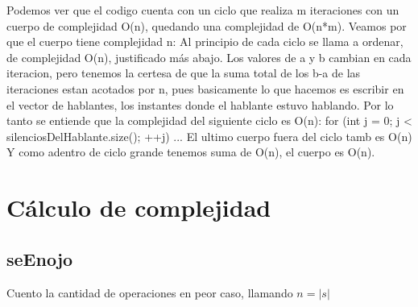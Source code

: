 \documentclass{article}
\begin{document}
Podemos ver que el codigo cuenta con un ciclo que realiza m iteraciones con un cuerpo de complejidad O(n), quedando una
complejidad de O(n*m). \newline
Veamos por que el cuerpo tiene complejidad n: \newline
Al principio de cada ciclo se llama a ordenar, de complejidad O(n), justificado más abajo. \newline
Los valores de a y b cambian en cada iteracion, pero tenemos la certesa de que la suma total de los b-a de las
iteraciones estan acotados por n, pues basicamente lo que hacemos es escribir en el vector de hablantes, los instantes
donde el hablante estuvo hablando. Por lo tanto se entiende que la complejidad del siguiente ciclo es O(n): \newline
for (int j = 0; j < silenciosDelHablante.size(); ++j) { \newline
    ... \newline
} \newline
El ultimo cuerpo fuera del ciclo tamb es O(n) \newline
Y como adentro de ciclo grande tenemos suma de O(n), el cuerpo es O(n). \newline

\newpage
{}
\section*{Cálculo de complejidad}
\vspace{0.5cm}
\subsection{seEnojo}
Cuento la cantidad de operaciones en peor caso, llamando $n=|s|$
\end{document}
